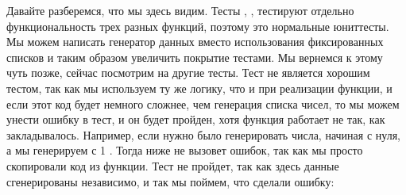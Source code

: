 \documentclass[letterpaper,10pt,russian]{sphinxmanual}
\begin{document}
\begin{sphinxVerbatim}[commandchars=\\\{\}]
     
          
           \PYG{p}{[}    \PYG{p}{]}
           \PYG{p}{[}    \PYG{p}{]}
           \PYG{p}{[}    \PYG{p}{]}
        
     
            
           
\end{sphinxVerbatim}

\sphinxAtStartPar
Давайте разберемся, что мы здесь видим. Тесты , ,  тестируют отдельно функциональность трех разных функций, поэтому это нормальные юнит\sphinxhyphen{}тесты. Мы можем написать генератор данных вместо использования фиксированных списков \sphinxcode{\sphinxupquote{{[}0, 1, 2, 3, 4{]}}} и таким образом увеличить покрытие тестами. Мы вернемся к этому чуть позже, сейчас посмотрим на другие тесты. Тест  не является хорошим тестом, так как мы используем ту же логику, что и при реализации функции, и если этот код будет немного сложнее, чем генерация списка чисел, то мы можем унести ошибку в тест, и он будет пройден, хотя функция работает не так, как закладывалось. Например, если нужно было генерировать числа, начиная с нуля, а мы генерируем с 1 . Тогда  ниже не вызовет ошибок, так как мы просто скопировали код из функции. Тест  не пройдет, так как здесь данные сгенерированы независимо, и так мы поймем, что сделали ошибку:
\end{document}
